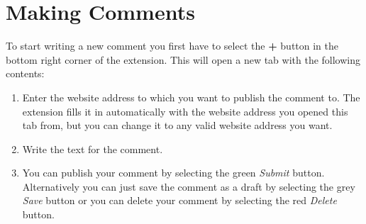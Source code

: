 \documentclass{article}
\begin{document}
\section{Making Comments}
To start writing a new comment you first have to select the \textbf{+} button in the bottom right corner of the extension. This will open a new tab with the following contents:
\begin{figure}[H]
    \centering
\end{figure}

\begin{enumerate}
    \item Enter the website address to which you want to publish the comment to. The extension fills it in automatically with the website address you opened this tab from, but you can change it to any valid website address you want.
    \item Write the text for the comment.
    \item You can publish your comment by selecting the green \textit{Submit} button. Alternatively you can just save the comment as a draft by selecting the grey \textit{Save} button or you can delete your comment by selecting the red \textit{Delete} button.
\end{enumerate}
\end{document}
